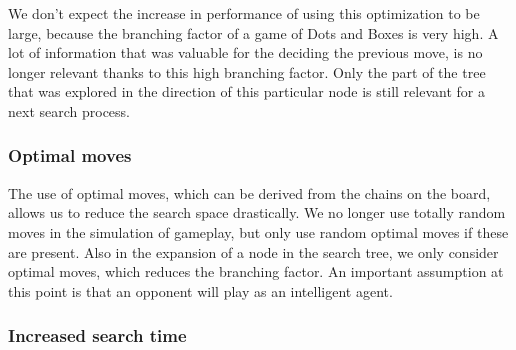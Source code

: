 	We don't expect the increase in performance of using this optimization to be large, because the branching factor of a game of Dots and Boxes is very high. A lot of information that was valuable for the deciding the previous move, is no longer relevant thanks to this high branching factor. Only the part of the tree that was explored in the direction of this particular node is still relevant for a next search process.
	
	\subsubsection{Optimal moves\label{s:optimalMoves}}
	
	The use of optimal moves, which can be derived from the chains on the board, allows us to reduce the search space drastically. We no longer use totally random moves in the simulation of gameplay, but only use random optimal moves if these are present. Also in the expansion of a node in the search tree, we only consider optimal moves, which reduces the branching factor.
	An important assumption at this point is that an opponent will play as an intelligent agent.
	
	\subsubsection{Increased search time}